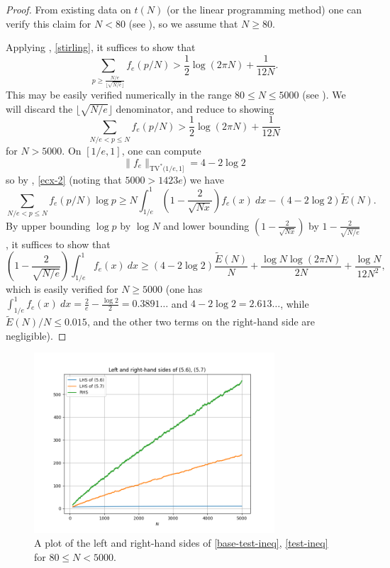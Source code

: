 \documentclass[12pt,a4paper,reqno]{amsart}
\numberwithin{equation}{section}
\theoremstyle{plain}
\theoremstyle{definition}
\begin{document}
\begin{proof}  From existing data on $t(N)$ (or the linear programming method) one can verify this claim for $N < 80$ (see ), so we assume that $N\geq 80$.
  
Applying , \eqref{stirling}, it suffices to show that
\begin{equation}\label{base-test-ineq}
   \sum_{p \geq \frac{N/e}{\lfloor\sqrt{N/e}\rfloor}} f_{e}(p/N) > \frac{1}{2} \log(2\pi N) + \frac{1}{12N}.
\end{equation}
This may be easily verified numerically in the range $80 \leq N \leq 5000$ (see ).
We will discard the $\lfloor\sqrt{N/e}\rfloor$ denominator, and reduce to showing
\begin{equation}\label{test-ineq}
  \sum_{N/e < p \leq N} f_{e}(p/N) > \frac{1}{2} \log(2\pi N) + \frac{1}{12N}
\end{equation}
for $N > 5000$.  On $[1/e,1]$, one can compute
$$ \|f_e\|_{\mathrm{TV}^*(1/e,1]}
= 4 - 2 \log 2$$
so by , \eqref{ecx-2} (noting that $5000 > 1423e$) we have
$$ \sum_{N/e < p \leq N} f_{e}(p/N) \log p
\geq N \int_{1/e}^1 \left(1-\frac{2}{\sqrt{Nx}}\right) f_e(x)\ dx - (4 - 2 \log 2) \tilde E(N).
$$
By upper bounding $\log p$ by $\log N$ and lower bounding $\left(1-\frac{2}{\sqrt{Nx}}\right)$ by $1 - \frac{2}{\sqrt{N/e}}$, it suffices to show that
$$ \left(1 - \frac{2}{\sqrt{N/e}}\right) \int_{1/e}^1 f_e(x)\ dx \geq
(4 - 2 \log 2) \frac{\tilde E(N)}{N}
+ \frac{\log N \log(2\pi N)}{2N} + \frac{\log N}{12N^2},$$
which is easily verified for $N \geq 5000$ (one has $\int_{1/e}^1 f_e(x)\ dx = \frac{2}{e}-\frac{\log 2}{2}=0.3891\dots$ and $4-2\log 2 = 2.613\dots$, while $\tilde E(N)/N \leq 0.015$, and the other two terms on the right-hand side are negligible).
\end{proof}

\begin{figure}
  \centering
  \includegraphics[width=0.8\textwidth]{lhs_rhs.png}
  \caption{A plot of the left and right-hand sides of \eqref{base-test-ineq}, \eqref{test-ineq} for $80 \leq N < 5000$.}\label{fig2}
\end{figure}
\end{document}
